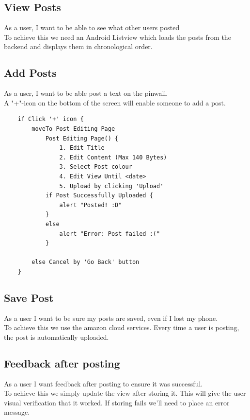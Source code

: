 \documentclass[conference]{IEEEtran}
\numberwithin{figure}{subsection}
\begin{document}
\subsection{View Posts}
As a user, I want to be able to see what other users posted\\

To achieve this we need an Android Listview which loads the posts from the backend and displays them in chronological order.
	
\subsection{Add Posts}
As a user, I want to be able post a text on the pinwall.\\

A "+"-icon on the bottom of the screen will enable someone to add a post.
\begin{lstlisting}
    if Click '+' icon {
        moveTo Post Editing Page
            Post Editing Page() {
                1. Edit Title
                2. Edit Content (Max 140 Bytes)
                3. Select Post colour
                4. Edit View Until <date>
                5. Upload by clicking 'Upload'
            if Post Successfully Uploaded {
                alert "Posted! :D"
            }
            else
                alert "Error: Post failed :("
            }
        
        else Cancel by 'Go Back' button
    }
\end{lstlisting}

\subsection{Save Post}
As a user I want to be sure my posts are saved, even if I lost my phone.\\

To achieve this we use the amazon cloud services. Every time a user is posting, the post is automatically uploaded.

\subsection{Feedback after posting}
As a user I want feedback after posting to ensure it was successful.\\

To achieve this we simply update the view after storing it. This will give the user visual verification that it worked. If storing fails we'll need to place an error message.
\end{document}
